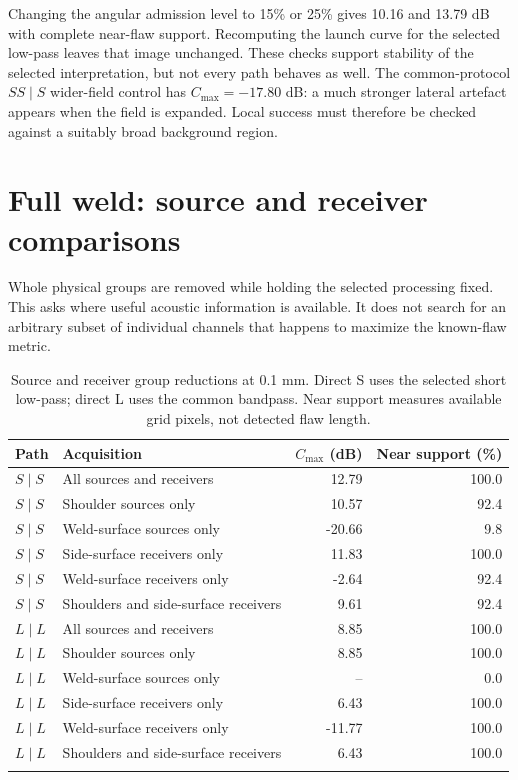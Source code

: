 Changing the angular admission level to 15\% or 25\% gives 10.16 and 13.79 dB with complete near-flaw support. Recomputing the launch curve for the selected low-pass leaves that image unchanged. These checks support stability of the selected interpretation, but not every path behaves as well. The common-protocol $SS\mid S$ wider-field control has $C_{\max}=-17.80$ dB: a much stronger lateral artefact appears when the field is expanded. Local success must therefore be checked against a suitably broad background region.


\section{Full weld: source and receiver comparisons}
\label{saftapp:archive:full:acquisition_results}
Whole physical groups are removed while holding the selected processing fixed. This asks where useful acoustic information is available. It does not search for an arbitrary subset of individual channels that happens to maximize the known-flaw metric.

\begin{table}[!htbp]\centering\small
\caption{Source and receiver group reductions at 0.1 mm. Direct S uses the selected short low-pass; direct L uses the common bandpass. Near support measures available grid pixels, not detected flaw length.}
\begin{tabularx}{\linewidth}{@{}lXrr@{}}\toprule
Path & Acquisition & $C_{\max}$ (dB) & Near support (\%)\\\midrule
$S\mid S$ & All sources and receivers & 12.79 & 100.0 \\
$S\mid S$ & Shoulder sources only & 10.57 & 92.4 \\
$S\mid S$ & Weld-surface sources only & -20.66 & 9.8 \\
$S\mid S$ & Side-surface receivers only & 11.83 & 100.0 \\
$S\mid S$ & Weld-surface receivers only & -2.64 & 92.4 \\
$S\mid S$ & Shoulders and side-surface receivers & 9.61 & 92.4 \\
\addlinespace
$L\mid L$ & All sources and receivers & 8.85 & 100.0 \\
$L\mid L$ & Shoulder sources only & 8.85 & 100.0 \\
$L\mid L$ & Weld-surface sources only & -- & 0.0 \\
$L\mid L$ & Side-surface receivers only & 6.43 & 100.0 \\
$L\mid L$ & Weld-surface receivers only & -11.77 & 100.0 \\
$L\mid L$ & Shoulders and side-surface receivers & 6.43 & 100.0 \\
\addlinespace

\bottomrule\end{tabularx}
\label{saftapp:archive:full:groups}
\end{table}

